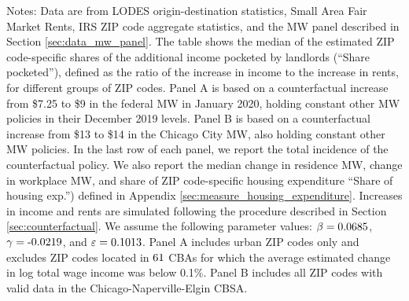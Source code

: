 \begin{table}[hbt!]
    \begin{minipage}{.95\textwidth} \footnotesize
        \vspace{3.5mm}
        Notes: 
        Data are from LODES origin-destination statistics, 
        Small Area Fair Market Rents, 
        IRS ZIP code aggregate statistics, and 
        the MW panel described in Section \ref{sec:data_mw_panel}.
        The table shows the median of the estimated ZIP code-specific shares of 
        the additional income pocketed by landlords (``Share pocketed''), 
        defined as the ratio of the increase in income to the increase in rents,
        for different groups of ZIP codes.
        Panel A is based on a counterfactual increase from \$7.25 to \$9 in the 
        federal MW in January 2020, holding constant other MW policies in their 
        December 2019 levels.
        Panel B is based on a counterfactual increase from \$13 to \$14 in the 
        Chicago City MW, also holding constant other MW policies.
        In the last row of each panel, we report the total incidence of the 
        counterfactual policy.
        We also report the median change in residence MW, change in workplace MW,
        and share of ZIP code-specific housing expenditure ``Share of housing 
        exp.'') defined in Appendix \ref{sec:measure_housing_expenditure}.
        Increases in income and rents are simulated following the procedure 
        described in Section \ref{sec:counterfactual}.
        We assume the following parameter values: 
        $\beta = \textnormal{0.0685}$, $\gamma = \textnormal{-0.0219}$, and $\varepsilon = \textnormal{0.1013}$.
        Panel A includes urban ZIP codes only and excludes ZIP codes located 
        in $\textnormal{61}$ CBAs for which the average estimated change in 
        log total wage income was below 0.1\%.
        Panel B includes all ZIP codes with valid data in the 
        Chicago-Naperville-Elgin CBSA.
    \end{minipage}
\end{table}


